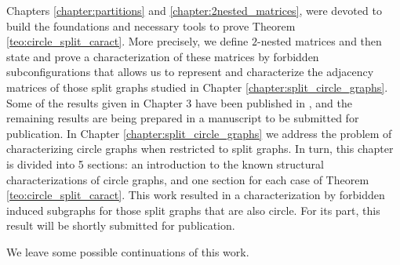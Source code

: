\documentclass[12pt]{book}
\theoremstyle{plain}
\theoremstyle{remark}
\begin{document}
Chapters \ref{chapter:partitions} and \ref{chapter:2nested_matrices}, were devoted to build the foundations and necessary tools to prove Theorem \ref{teo:circle_split_caract}.
More precisely, we define $2$-nested matrices and then state and prove a characterization of these matrices by forbidden subconfigurations that allows us to represent and characterize the adjacency matrices of those split graphs studied in Chapter \ref{chapter:split_circle_graphs}.
Some of the results given in Chapter $3$ have been published in \cite{PDGS19}, and the remaining results are being prepared in a manuscript to be submitted for publication.
In Chapter \ref{chapter:split_circle_graphs} we address the problem of characterizing circle graphs when restricted to split graphs. In turn, this chapter is divided into 5 sections: an introduction to the known structural characterizations of circle graphs, and one section for each case of Theorem \ref{teo:circle_split_caract}. This work resulted in a characterization by forbidden induced subgraphs for those split graphs that are also circle. For its part, this result will be shortly submitted for publication.

We leave some possible continuations of this work.
\end{document}

